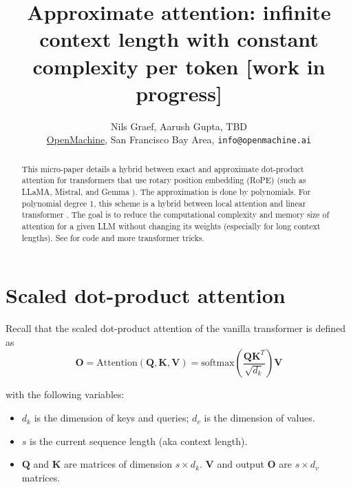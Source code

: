 \documentclass{article}
\title{Approximate attention: infinite context length with constant complexity per token [work in progress]}
\author{Nils Graef, Aarush Gupta, TBD \\ \href{https://openmachine.ai}{OpenMachine},
  San Francisco Bay Area, \texttt{info@openmachine.ai}}
\numberwithin{equation}{section} %
\newcommand{\mat}[1]{\mathbf{#1}}          %
\def\Q{\mat{Q}}
\def\K{\mat{K}}
\def\V{\mat{V}}
\def\O{\mat{O}}
\begin{document}
 \maketitle

\begin{abstract}
This micro-paper \citep{micro-paper} details a hybrid between exact and approximate dot-product attention for transformers that use rotary position embedding (RoPE) \citep{RoPE} (such as LLaMA, Mistral, and Gemma \citep{LLaMA, Llama2, mistral, gemma}). The approximation is done by polynomials. For polynomial degree 1, this scheme is a hybrid between local attention \citep{longformer} and linear transformer \citep{linear}. The goal is to reduce the computational complexity and memory size of attention for a given LLM without changing its weights (especially for long context lengths). See \citep{tricks, precompute} for code and more transformer tricks.
\end{abstract}

\section{Scaled dot-product attention}
Recall that the scaled dot-product attention of the vanilla transformer \citep{vanilla} is defined as
\begin{equation}
  \O = \text{Attention} \left( \Q, \K, \V \right) = \text{softmax} \left( \frac{\Q \K^T}{\sqrt{d_k}} \right) \V
\end{equation}

with the following variables:
\begin{itemize}[topsep=-1pt, itemsep=-1pt]
  \item $d_k$ is the dimension of keys and queries; $d_v$ is the dimension of values.
  \item $s$ is the current sequence length (aka context length).
  \item $\Q$ and $\K$ are matrices of dimension $s \times d_k$. $\V$ and output $\O$ are $s \times d_v$ matrices.
\end{itemize}
\end{document}
